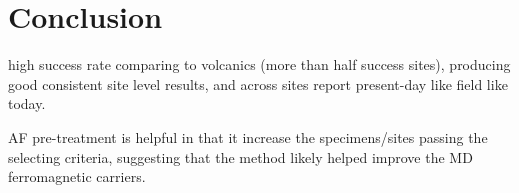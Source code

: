 \documentclass[draft]{agujournal2019}
\begin{document}









\section*{Conclusion}
high success rate comparing to volcanics (more than half success sites), producing good consistent site level results, and across sites report present-day like field like today.

AF pre-treatment is helpful in that it increase the specimens/sites passing the selecting criteria, suggesting that the method likely helped improve the MD ferromagnetic carriers. 
\end{document}
